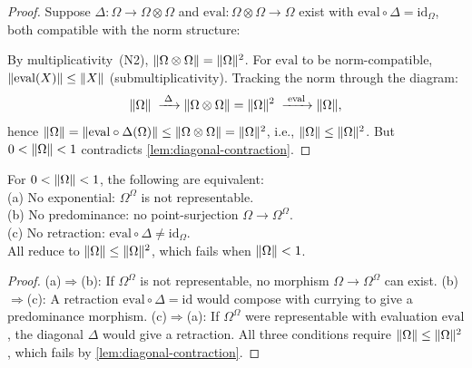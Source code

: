 \begin{proof}
Suppose $\Delta\colon\Omega\to\Omega\otimes\Omega$ and
$\mathrm{eval}\colon\Omega\otimes\Omega\to\Omega$ exist with
$\mathrm{eval}\circ\Delta=\mathrm{id}_\Omega$, both compatible with the
norm structure:
%
\begin{center}
\end{center}
%
\noindent
By multiplicativity~(N2),
$\|\Omega\otimes\Omega\|=\|\Omega\|^2$.  For $\mathrm{eval}$ to
be norm-compatible, $\|\mathrm{eval}(X)\|\le\|X\|$
(submultiplicativity).  Tracking the norm through the diagram:
\[
  \|\Omega\|
  \;\xrightarrow{\;\Delta\;}
  \|\Omega\otimes\Omega\| = \|\Omega\|^2
  \;\xrightarrow{\;\mathrm{eval}\;}
  \|\Omega\|,
\]
hence
$\|\Omega\|=\|\mathrm{eval}\circ\Delta(\Omega)\|\le
\|\Omega\otimes\Omega\|=\|\Omega\|^2$,
i.e., $\|\Omega\|\le\|\Omega\|^2$.  But $0<\|\Omega\|<1$
contradicts \cref{lem:diagonal-contraction}.
\end{proof}

\begin{proposition}\label{prop:equiv-obstructions}
For $0 < \|\Omega\| < 1$, the following are equivalent:
\\
(a) No exponential: $\Omega^\Omega$ is not representable.
\\
(b) No predominance: no point-surjection $\Omega\to\Omega^\Omega$.
\\
(c) No retraction: $\mathrm{eval}\circ\Delta\ne\mathrm{id}_\Omega$.
\\
All reduce to $\|\Omega\|\le\|\Omega\|^2$, which fails when $\|\Omega\|<1$.
\end{proposition}

\begin{proof}
(a)$\Rightarrow$(b): If $\Omega^\Omega$ is not representable, no morphism
$\Omega\to\Omega^\Omega$ can exist.
(b)$\Rightarrow$(c): A retraction $\mathrm{eval}\circ\Delta=\mathrm{id}$
would compose with currying to give a predominance morphism.
(c)$\Rightarrow$(a): If $\Omega^\Omega$ were representable with evaluation
$\mathrm{eval}$, the diagonal $\Delta$ would give a retraction.  All three
conditions require $\|\Omega\|\le\|\Omega\|^2$, which fails by
\cref{lem:diagonal-contraction}.
\end{proof}

